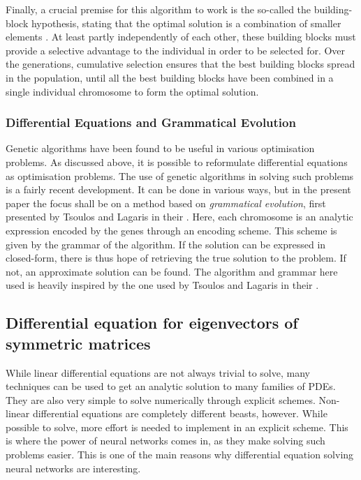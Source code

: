 \documentclass[multicolumn, 9pt]{extarticle}
\begin{document}
Finally, a crucial premise for this algorithm to work is the so-called the building-block hypothesis, stating that the optimal solution is a combination of smaller elements \cite{Eyal}. At least partly independently of each other, these building blocks must provide a selective advantage to the individual in order to be selected for. Over the generations, cumulative selection ensures that the best building blocks spread in the population, until all the best building blocks have been combined in a single individual chromosome to form the optimal solution.


\subsubsection{Differential Equations and Grammatical Evolution}
Genetic algorithms have been found to be useful in various optimisation problems. As discussed above, it is possible to reformulate differential equations as optimisation problems. The use of genetic algorithms in solving such problems is a fairly recent development. It can be done in various ways, but in the present paper the focus shall be on a method based on \textit{grammatical evolution}, first presented by Tsoulos and Lagaris in their \cite{Lagaris}. Here, each chromosome is an analytic expression encoded by the genes through an encoding scheme. This scheme is given by the grammar of the algorithm. If the solution can be expressed in closed-form, there is thus hope of retrieving the true solution to the problem. If not, an approximate solution can be found. The algorithm and grammar here used is heavily inspired by the one used by Tsoulos and Lagaris in their  \cite{Lagaris}.

\subsection{Differential equation for eigenvectors of symmetric matrices}
While linear differential equations are not always trivial to solve, many techniques can be used to get an analytic solution to many families of PDEs. They are also very simple to solve numerically through explicit schemes. Non-linear differential equations are completely different beasts, however. While possible to solve, more effort is needed to implement in an explicit scheme. This is where the power of neural networks comes in, as they make solving such problems easier. This is one of the main reasons why differential equation solving neural networks are interesting.
\end{document}
